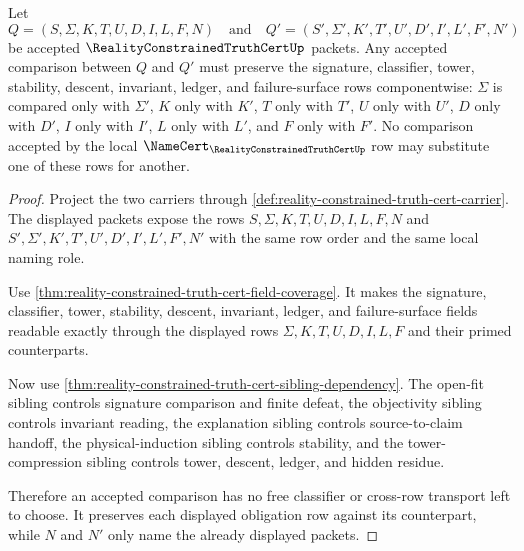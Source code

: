 \begin{theorem}
\label{thm:reality-constrained-truth-cert-classifier-stability}
Let
$$
Q=(S,\Sigma,K,T,U,D,I,L,F,N)
\quad\text{and}\quad
Q'=(S',\Sigma',K',T',U',D',I',L',F',N')
$$
be accepted $\RealityConstrainedTruthCertUp$ packets. Any accepted comparison
between $Q$ and $Q'$ must preserve the signature, classifier, tower, stability,
descent, invariant, ledger, and failure-surface rows componentwise:
$\Sigma$ is compared only with $\Sigma'$, $K$ only with $K'$, $T$ only with
$T'$, $U$ only with $U'$, $D$ only with $D'$, $I$ only with $I'$, $L$ only
with $L'$, and $F$ only with $F'$. No comparison accepted by the local
$\NameCert_{\RealityConstrainedTruthCertUp}$ row may substitute one of these
rows for another.
\end{theorem}
\begin{proof}
Project the two carriers through
\autoref{def:reality-constrained-truth-cert-carrier}. The displayed packets
expose the rows $S,\Sigma,K,T,U,D,I,L,F,N$ and
$S',\Sigma',K',T',U',D',I',L',F',N'$ with the same row order and the same
local naming role.

Use \autoref{thm:reality-constrained-truth-cert-field-coverage}. It makes the
signature, classifier, tower, stability, descent, invariant, ledger, and
failure-surface fields readable exactly through the displayed rows
$\Sigma,K,T,U,D,I,L,F$ and their primed counterparts.

Now use \autoref{thm:reality-constrained-truth-cert-sibling-dependency}. The
open-fit sibling controls signature comparison and finite defeat, the
objectivity sibling controls invariant reading, the explanation sibling
controls source-to-claim handoff, the physical-induction sibling controls
stability, and the tower-compression sibling controls tower, descent, ledger,
and hidden residue.

Therefore an accepted comparison has no free classifier or cross-row transport
left to choose. It preserves each displayed obligation row against its
counterpart, while $N$ and $N'$ only name the already displayed packets.
\end{proof}


